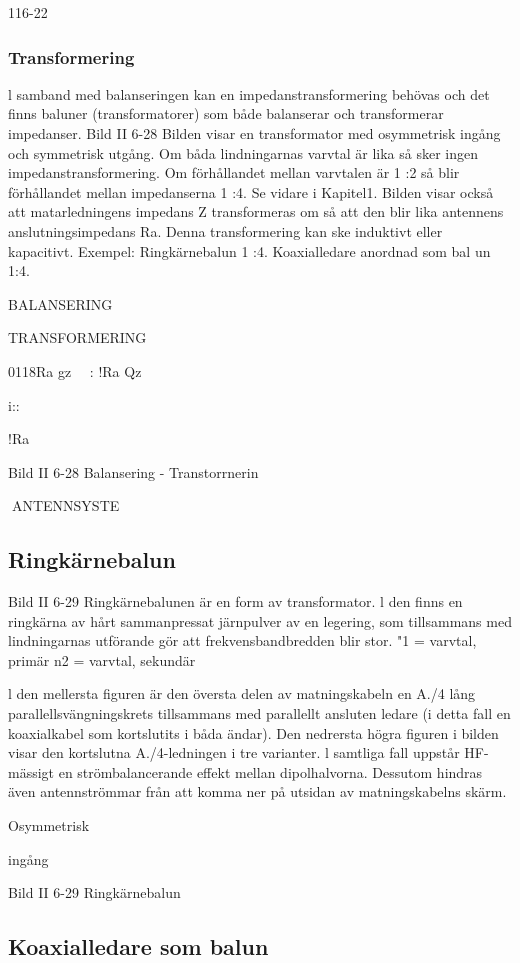 {{116-22

\subsubsection{Transformering}
l samband med balanseringen kan en
impedanstransformering behövas och det
finns baluner (transformatorer) som både
balanserar och transformerar impedanser.
Bild II 6-28
Bilden visar en transformator med osymmetrisk ingång och symmetrisk utgång. Om
båda lindningarnas varvtal är lika så sker
ingen impedanstransformering. Om förhållandet mellan varvtalen är 1 :2 så blir förhållandet mellan impedanserna 1 :4. Se vidare
i Kapitel1.
Bilden visar också att matarledningens
impedans Z transformeras om så att den blir
lika antennens anslutningsimpedans Ra.
Denna transformering kan ske induktivt eller kapacitivt.
Exempel:
Ringkärnebalun 1 :4.
Koaxialledare anordnad som bal un 1:4.

BALANSERING

TRANSFORMERING

0118Ra
gz
~~: !Ra
Qz

i::

!Ra

Bild II 6-28 Balansering - Transtorrnerin

ANTENNSYSTE
\subsection{Ringkärnebalun}

Bild II 6-29
Ringkärnebalunen är en form av transformator. l den finns en ringkärna av hårt
sammanpressat järnpulver av en legering,
som tillsammans med lindningarnas utförande gör att frekvensbandbredden blir stor.
"1 = varvtal, primär
n2 = varvtal, sekundär

l den mellersta figuren är den översta
delen av matningskabeln en A./4 lång parallellsvängningskrets tillsammans med parallellt ansluten ledare (i detta fall en koaxialkabel som kortslutits i båda ändar). Den
nedrersta högra figuren i bilden visar den
kortslutna A./4-ledningen i tre varianter. l
samtliga fall uppstår HF-mässigt en strömbalancerande effekt mellan dipolhalvorna.
Dessutom hindras även antennströmmar från att komma ner på utsidan av matningskabelns skärm.

Osymmetrisk

ingång

Bild II 6-29 Ringkärnebalun

\subsection{Koaxialledare som balun}

}}
